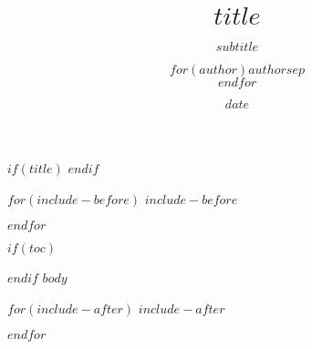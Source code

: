 \documentclass[usenames,dvipsnames,10pt,aspectratio=169]{beamer}
\title{$title$}
\subtitle{$subtitle$}
\author{$for(author)$$author$$sep$ \\ $endfor$}
\date{$date$}
\begin{document}
$if(title)$
\frame{\maketitle}
$endif$

$for(include-before)$
$include-before$

$endfor$

$if(toc)$
\begin{frame}
\tableofcontents[hideallsubsections]
\end{frame}

$endif$
$body$

$for(include-after)$
$include-after$

$endfor$
\end{document}
